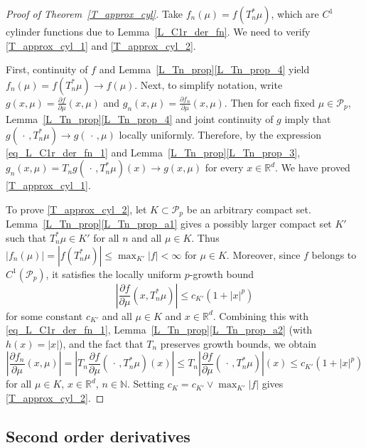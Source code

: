 \documentclass{article}
\theoremstyle{definition}
\numberwithin{equation}{section}
\numberwithin{theorem}{section}
\newcommand{\R}{\mathbb{R}}
\newcommand{\Nb}{\mathbb{N}}
\newcommand{\Pcal}{{\mathcal P}}
\newcommand{\fdot}{{\,\cdot\,}}
\begin{document}
\begin{proof}[Proof of Theorem~\ref{T_approx_cyl}]
Take $f_n(\mu)=f(T_n^*\mu)$, which are $C^1$ cylinder functions due to Lemma~\ref{L_C1r_der_fn}. We need to verify \eqref{T_approx_cyl_1} and \eqref{T_approx_cyl_2}.

First, continuity of $f$ and Lemma~\ref{L_Tn_prop}\ref{L_Tn_prop_4} yield $f_n(\mu)=f(T_n^*\mu)\to f(\mu)$. Next, to simplify notation, write $g(x,\mu)=\frac{\partial f}{\partial\mu}(x,\mu)$ and $g_n(x,\mu)=\frac{\partial f_n}{\partial\mu}(x,\mu)$. Then for each fixed $\mu\in\Pcal_p$, Lemma~\ref{L_Tn_prop}\ref{L_Tn_prop_4} and joint continuity of $g$ imply that $g(\fdot,T_n^*\mu)\to g(\fdot,\mu)$ locally uniformly. Therefore, by the expression \eqref{eq_L_C1r_der_fn_1} and Lemma~\ref{L_Tn_prop}\ref{L_Tn_prop_3}, $g_n(x,\mu)=T_ng(\fdot,T_n^*\mu)(x)\to g(x,\mu)$ for every $x\in {\R^d}$. We have proved \eqref{T_approx_cyl_1}.

To prove \eqref{T_approx_cyl_2}, let $K \subset \Pcal_p$ be an arbitrary compact set. Lemma~\ref{L_Tn_prop}\ref{L_Tn_prop_a1} gives a possibly larger compact set $K'$ such that $T_n^*\mu\in K'$ for all $n$ and all $\mu\in K$. Thus $|f_n(\mu)| = |f(T_n^*\mu)| \le \max_{K'} |f| < \infty$ for $\mu \in K$. Moreover, since $f$ belongs to $C^1(\Pcal_p)$, it satisfies the locally uniform $p$-growth bound
\[
\left| \frac{\partial f}{\partial\mu}(x,T_n^*\mu) \right| \le c_{K'} (1+|x|^p)
\]
for some constant $c_{K'}$ and all $\mu \in K$ and $x \in {\R^d}$. Combining this with \eqref{eq_L_C1r_der_fn_1}, Lemma~\ref{L_Tn_prop}\ref{L_Tn_prop_a2} (with $h(x)=|x|$), and the fact that $T_n$ preserves growth bounds, we obtain
\[
\left| \frac{\partial f_n}{\partial\mu}(x,\mu) \right|
= \left| T_n \frac{\partial f}{\partial\mu}(\fdot,T_n^*\mu)(x) \right|
\le T_n \left| \frac{\partial f}{\partial\mu}(\fdot,T_n^*\mu) \right|(x)
\le c_{K'} (1+|x|^p)
\]
for all $\mu \in K$, $x \in {\R^d}$, $n\in\Nb$. Setting $c_K = c_{K'} \vee \max_{K'} |f|$ gives \eqref{T_approx_cyl_2}.
\end{proof}









\subsection{Second order derivatives}
\end{document}
